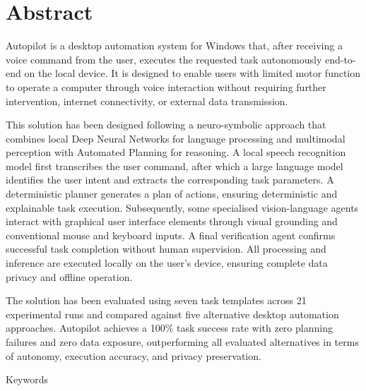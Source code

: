 \chapter*{Abstract}

Autopilot is a desktop automation system for Windows that, after receiving a voice command from the user, executes the requested task autonomously end-to-end on the local device. It is designed to enable users with limited motor function to operate a computer through voice interaction without requiring further intervention, internet connectivity, or external data transmission.

This solution has been designed following a neuro-symbolic approach that combines local Deep Neural Networks for language processing and multimodal perception with Automated Planning for reasoning. A local speech recognition model first transcribes the user command, after which a large language model identifies the user intent and extracts the corresponding task parameters. A deterministic planner generates a plan of actions, ensuring deterministic and explainable task execution. Subsequently, some specialised vision-language agents interact with graphical user interface elements through visual grounding and conventional mouse and keyboard inputs. A final verification agent confirms successful task completion without human supervision. All processing and inference are executed locally on the user's device, ensuring complete data privacy and offline operation.

The solution has been evaluated using seven task templates across 21 experimental runs and compared against five alternative desktop automation approaches. Autopilot achieves a 100\% task success rate with zero planning failures and zero data exposure, outperforming all evaluated alternatives in terms of autonomy, execution accuracy, and privacy preservation.
\begin{keywords}{Keywords}
  \mykeywords{}
\end{keywords}
